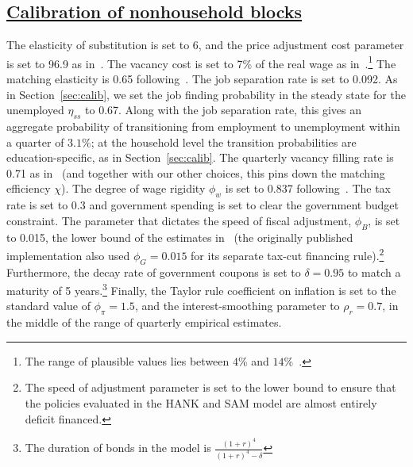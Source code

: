 \documentclass[\latexroot/\projectname]{subfiles}
\begin{document}
\begin{table}
  \begin{center}
    \renewcommand{\arraystretch}{1.6}
    \caption{Calibration}\whenintegrated{\label{table:Calibration}} %
  \end{center}
\end{table}

\subsection{\href{\WebBase\#sec:hank-calibration}{Calibration of nonhousehold blocks }}\whenintegrated{\label{sec:hank-calibration}}

The elasticity of substitution is set to 6, and the price adjustment cost parameter is set to 96.9 as in~\cite{Ravn2017,Ravn2021}.
The vacancy cost is set to 7\% of the real wage as in~\cite{Christiano2016}.\footnote{The range of plausible values lies between $4\%$ and $14\%$~\cite{Silva2009}.} The matching elasticity is 0.65 following~\cite{Ravn2017,Ravn2021}. The job separation rate is set to 0.092. As in Section~\ref{sec:calib}, we set the job finding probability in the steady state for the unemployed $\eta_{ss}$ to 0.67. Along with the job separation rate, this gives an aggregate probability of transitioning from employment to unemployment within a quarter of $3.1\%$; at the household level the transition probabilities are education-specific, as in Section~\ref{sec:calib}. The quarterly vacancy filling rate is 0.71 as in~\cite{DenHaan2000} (and together with our other choices, this pins down the matching efficiency $\chi$). The degree of wage rigidity $\phi_w$ is set to 0.837 following~\cite{Gornemann2021}. The tax rate is set to 0.3 and government spending is set to clear the government budget constraint. The parameter that dictates the speed of fiscal adjustment, $\phi_{B}$, is set to 0.015, the lower bound of the estimates in~\cite{arsJumpsHumps} (the originally published implementation also used $\phi_{G}=0.015$ for its separate tax-cut financing rule).\footnote{The speed of adjustment parameter is set to the lower bound to ensure that the policies evaluated in the HANK and SAM model are almost entirely deficit financed.} Furthermore, the decay rate of government coupons is set to $\delta = 0.95$ to match a maturity of 5 years.\footnote{The duration of bonds in the model is $\frac{{(1+r)}^4}{{(1+r)}^4 - \delta}$} Finally, the Taylor rule coefficient on inflation is set to the standard value of $\phi_{\pi}=1.5$, and the interest-smoothing parameter to $\rho_{r}=0.7$, in the middle of the range of quarterly empirical estimates.
\end{document}
